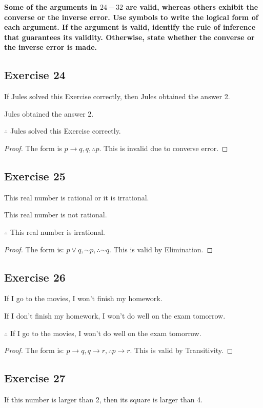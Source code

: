\documentclass[14pt]{extarticle}
\begin{document}
{\bf \color{cyan} Some of the arguments in $24-32$ are valid, whereas others exhibit the converse or the inverse error. Use symbols to write the logical form of each argument. If the argument is valid, identify the rule of inference that guarantees its validity. Otherwise, state whether the converse or the inverse error is made.}

\subsection{Exercise 24}
If Jules solved this Exercise correctly, then Jules obtained the answer 2.

Jules obtained the answer 2.

$\therefore$ Jules solved this Exercise correctly.

\begin{proof}
    The form is $p \to q, q, \therefore p$. This is invalid due to
    converse error.
\end{proof}

\subsection{Exercise 25}
This real number is rational or it is irrational.

This real number is not rational.

$\therefore$ This real number is irrational.

\begin{proof}
    The form is: $p \vee q, {\sim p}, \therefore {\sim q}$. This is valid by Elimination.
\end{proof}

\subsection{Exercise 26}
If I go to the movies, I won’t finish my homework.

If I don’t finish my homework, I won’t do well on the exam tomorrow.

$\therefore$ If I go to the movies, I won’t do well on the exam tomorrow.

\begin{proof}
    The form is: $p \to q, q \to r, \therefore p \to r$. This is valid by Transitivity.
\end{proof}

\subsection{Exercise 27}
If this number is larger than 2, then its square is larger than 4.
\end{document}
